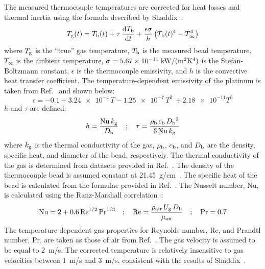 \documentclass[12pt]{article}
\begin{document}
The measured thermocouple temperatures are corrected for heat losses and thermal inertia using the formula described by Shaddix~\cite{Shaddix1999}:
\begin{equation}\label{eq:Thermocouple_Bead_Correction}
   {T_{\rm g}(t)}= T_{\rm b}(t) + \tau \, \frac{{\rm d}T_{\rm b}}{{\rm d}t} + \frac{\epsilon\sigma}{h}\left(T_{\rm b}(t)^4-T_\infty^4\right)
\end{equation}
where $T_{\rm g}$ is the ``true'' gas temperature, $T_{\rm b}$ is the measured bead temperature, $T_\infty$ is the ambient temperature, $\sigma=5.67 \times 10^{-11} \; {\rm kW}/({\rm m}^2{\rm K}^4)$ is the Stefan-Boltzmann constant, $\epsilon$ is the thermocouple emissivity, and $h$ is the convective heat transfer coefficient. The temperature-dependent emissivity of the platinum is taken from Ref.~\cite{Shaddix1999} and shown below:
\begin{equation}\label{eq:epsilon}
\epsilon=-0.1+\num{3.24e-4} \, T - \num{1.25e-7} \, T^2 \, + \num{2.18e-11} T^3
\end{equation}
$h$ and $\tau$ are defined:
\begin{equation}\label{eq:h_eqn}
h=\frac{{\rm Nu} \, k_{\rm g}}{D_{\rm b}}  \quad ; \quad \tau= \frac{\rho_{\rm b} \, c_{\rm b} \, {D_{\rm b}}^2}{6 \, {\rm Nu} \, k_{\rm g}}
\end{equation}
where $k_{\rm g}$ is the thermal conductivity of the gas, $\rho_{\rm b}$, $c_{\rm b}$, and $D_{\rm b}$ are the density, specific heat, and diameter of the bead, respectively. The thermal conductivity of the gas is determined from datasets provided in Ref.~\cite{Touloukian1970}. The density of the thermocouple bead is assumed constant at 21.45~g/cm~\cite{Platinum2010}. The specific heat of the bead is calculated from the formulae provided in Ref.~\cite{Jaeger1939}. The Nusselt number, Nu, is calculated using the Ranz-Marshall correlation~\cite{Shaddix1999}:
\begin{equation}\label{eq:Nu_number}
{\rm Nu} = 2 + 0.6 \, \textrm{Re}^{1/2} \, \textrm{Pr}^{1/3} \quad ; \quad \textrm{Re} = \frac{ \rho_{\rm air} \, U_{\rm g} \, D_{\rm b} }{\mu_{\rm air}}  \quad ; \quad \textrm{Pr}=0.7
\end{equation}
The temperature-dependent gas properties for Reynolds number, Re, and Prandtl number, Pr, are taken as those of air from Ref.~\cite{Incropera2007}. The gas velocity is assumed to be equal to 2~m/s. The corrected temperature is relatively insensitive to gas velocities between 1~m/s and 3~m/s, consistent with the results of Shaddix~\cite{Shaddix1999}.
\end{document}
